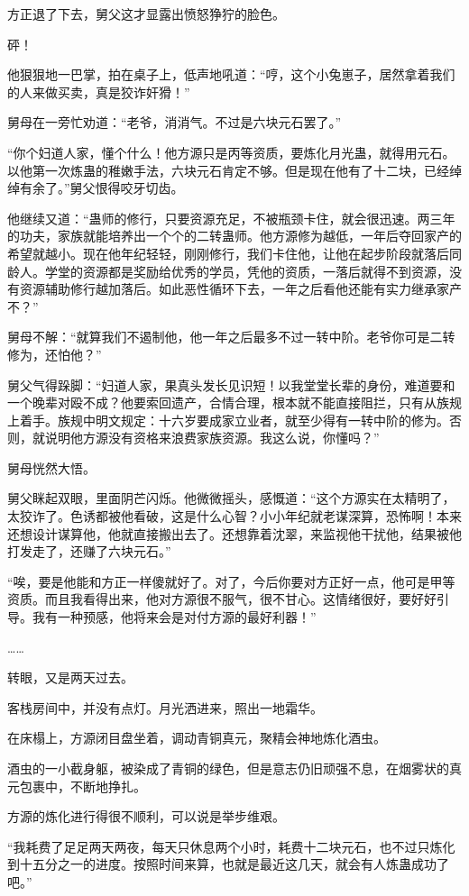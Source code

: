 \begin{this_body}
方正退了下去，舅父这才显露出愤怒狰狞的脸色。

砰！

他狠狠地一巴掌，拍在桌子上，低声地吼道：“哼，这个小兔崽子，居然拿着我们的人来做买卖，真是狡诈奸猾！”

舅母在一旁忙劝道：“老爷，消消气。不过是六块元石罢了。”

“你个妇道人家，懂个什么！他方源只是丙等资质，要炼化月光蛊，就得用元石。以他第一次炼蛊的稚嫩手法，六块元石肯定不够。但是现在他有了十二块，已经绰绰有余了。”舅父恨得咬牙切齿。

他继续又道：“蛊师的修行，只要资源充足，不被瓶颈卡住，就会很迅速。两三年的功夫，家族就能培养出一个个的二转蛊师。他方源修为越低，一年后夺回家产的希望就越小。现在他年纪轻轻，刚刚修行，我们卡住他，让他在起步阶段就落后同龄人。学堂的资源都是奖励给优秀的学员，凭他的资质，一落后就得不到资源，没有资源辅助修行越加落后。如此恶性循环下去，一年之后看他还能有实力继承家产不？”

舅母不解：“就算我们不遏制他，他一年之后最多不过一转中阶。老爷你可是二转修为，还怕他？”

舅父气得跺脚：“妇道人家，果真头发长见识短！以我堂堂长辈的身份，难道要和一个晚辈对殴不成？他要索回遗产，合情合理，根本就不能直接阻拦，只有从族规上着手。族规中明文规定：十六岁要成家立业者，就至少得有一转中阶的修为。否则，就说明他方源没有资格来浪费家族资源。我这么说，你懂吗？”

舅母恍然大悟。

舅父眯起双眼，里面阴芒闪烁。他微微摇头，感慨道：“这个方源实在太精明了，太狡诈了。色诱都被他看破，这是什么心智？小小年纪就老谋深算，恐怖啊！本来还想设计谋算他，他就直接搬出去了。还想靠着沈翠，来监视他干扰他，结果被他打发走了，还赚了六块元石。”

“唉，要是他能和方正一样傻就好了。对了，今后你要对方正好一点，他可是甲等资质。而且我看得出来，他对方源很不服气，很不甘心。这情绪很好，要好好引导。我有一种预感，他将来会是对付方源的最好利器！”

……

转眼，又是两天过去。

客栈房间中，并没有点灯。月光洒进来，照出一地霜华。

在床榻上，方源闭目盘坐着，调动青铜真元，聚精会神地炼化酒虫。

酒虫的一小截身躯，被染成了青铜的绿色，但是意志仍旧顽强不息，在烟雾状的真元包裹中，不断地挣扎。

方源的炼化进行得很不顺利，可以说是举步维艰。

“我耗费了足足两天两夜，每天只休息两个小时，耗费十二块元石，也不过只炼化到十五分之一的进度。按照时间来算，也就是最近这几天，就会有人炼蛊成功了吧。”


\end{this_body}

